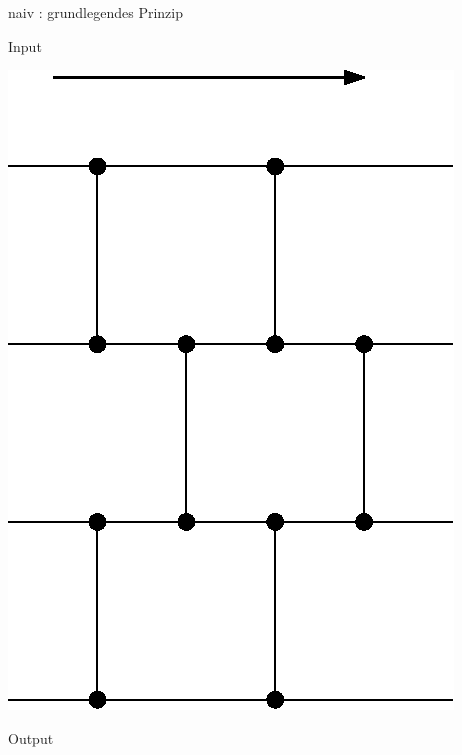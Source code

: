 \documentclass[ucs,9pt]{beamer}
\begin{document}
\begin{frame}{naiv : grundlegendes Prinzip}
\begin{minipage}[l]{2cm}
Input
\end{minipage}
\begin{minipage}[c]{7cm}
\begin{center}
    \includegraphics[scale=0.8]{bild2Komparatornetzwerk.eps}
\end{center}
\end{minipage}
\begin{minipage}[r]{2cm}
Output
\end{minipage}
\end{frame}
\end{document}

